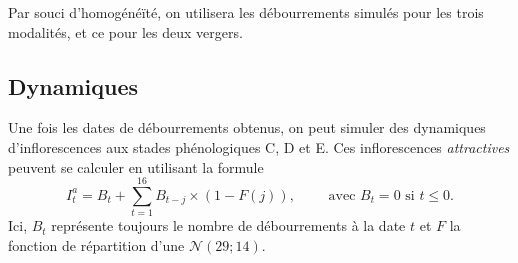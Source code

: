 Par souci d'homogénéïté, on utilisera les débourrements simulés pour les trois modalités, et ce pour les deux vergers.
 
 
\subsection{Dynamiques}


Une fois les dates de débourrements obtenus, on peut simuler des dynamiques d'inflorescences aux stades phénologiques C, D et E.
Ces inflorescences \emph{attractives} peuvent se calculer en utilisant la formule
\[
I_{t}^{a} = B_t + \sum_{t = 1}^{16} B_{t-j} \times \left( 1 - F(j) \right), \qquad \text{ avec } B_{t} = 0 \text{ si } t \leq 0. 
\]
Ici, $B_t$ représente toujours le nombre de débourrements à la date $t$ et $F$ la fonction de répartition d'une $\mathcal{N}\left( 29; 14 \right)$.

